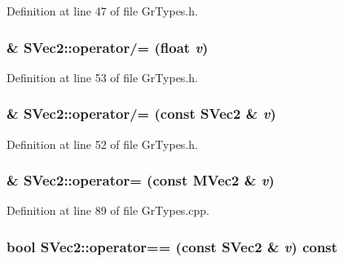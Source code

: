 Definition at line 47 of file GrTypes.h.\hypertarget{struct_s_vec2_87cc708daad64a9b08b7d18408b24566}{
\subsubsection[{operator/=}]{\& SVec2::operator/= (float {\em v})}}
\label{struct_s_vec2_87cc708daad64a9b08b7d18408b24566}




Definition at line 53 of file GrTypes.h.\hypertarget{struct_s_vec2_2e6c3bd7f5d0dd82e9f50449b160d398}{
\subsubsection[{operator/=}]{\& SVec2::operator/= (const {\bf SVec2} \& {\em v})}}
\label{struct_s_vec2_2e6c3bd7f5d0dd82e9f50449b160d398}




Definition at line 52 of file GrTypes.h.\hypertarget{struct_s_vec2_7d443082f1747463113b55d637b5452c}{
\subsubsection[{operator=}]{ \& SVec2::operator= (const {\bf MVec2} \& {\em v})}}
\label{struct_s_vec2_7d443082f1747463113b55d637b5452c}




Definition at line 89 of file GrTypes.cpp.\hypertarget{struct_s_vec2_a72ccdb5edf74c8746b1e16c45ab5f96}{
\subsubsection[{operator==}]{\setlength{\rightskip}{0pt plus 5cm}bool SVec2::operator== (const {\bf SVec2} \& {\em v}) const}}
\label{struct_s_vec2_a72ccdb5edf74c8746b1e16c45ab5f96}




